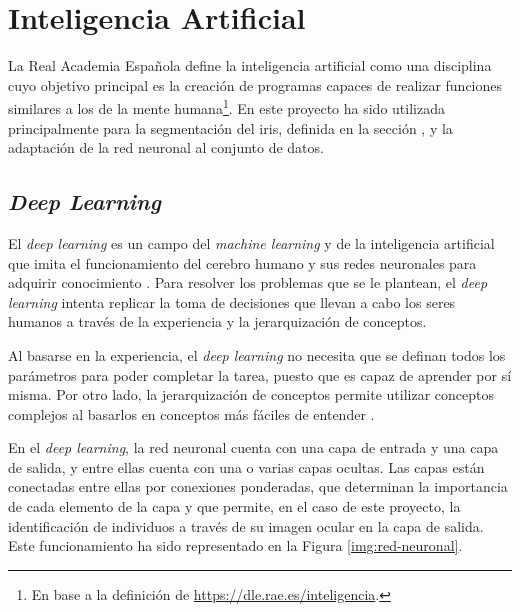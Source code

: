 \section{Inteligencia Artificial}

La Real Academia Española define la inteligencia artificial como una disciplina cuyo objetivo principal es la creación de programas capaces de realizar funciones similares a los de la mente humana\footnote{En base a la definición de \url{https://dle.rae.es/inteligencia}.}. 
En este proyecto ha sido utilizada principalmente para la segmentación del iris, definida en la sección , y la adaptación de la red neuronal al conjunto de datos.

\subsection{\textit{Deep Learning}}

El \textit{deep learning} es un campo del \textit{machine learning} y de la inteligencia artificial que imita el funcionamiento del cerebro humano y sus redes neuronales para adquirir conocimiento \cite{Goodfellow-et-al-2016}. 
Para resolver los problemas que se le plantean, el \textit{deep learning} intenta replicar la toma de decisiones que llevan a cabo los seres humanos a través de la experiencia y la jerarquización de conceptos. 

Al basarse en la experiencia, el \textit{deep learning} no necesita que se definan todos los parámetros para poder completar la tarea, puesto que es capaz de aprender por sí misma. Por otro lado, la jerarquización de conceptos permite utilizar conceptos complejos 
al basarlos en conceptos más fáciles de entender \cite{Goodfellow-et-al-2016}.

En el \textit{deep learning}, la red neuronal cuenta con una capa de entrada y una capa de salida, y entre ellas cuenta con una o varias capas ocultas. 
Las capas están conectadas entre ellas por conexiones ponderadas, que determinan la importancia de cada elemento de la capa y que permite, en el caso de este proyecto, la identificación de individuos a través de su imagen ocular en la capa de salida. Este funcionamiento ha sido representado en la Figura \ref{img:red-neuronal}.



